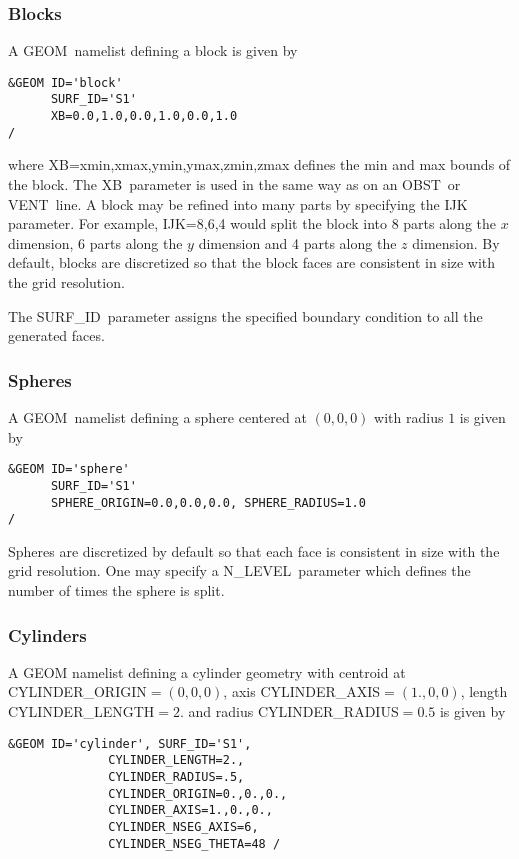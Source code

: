 \documentclass[12pt]{article}
\begin{document}
\subsubsection{Blocks}
A {\ct GEOM}\ namelist defining a block is given by

\begin{verbatim}
&GEOM ID='block'
      SURF_ID='S1'
      XB=0.0,1.0,0.0,1.0,0.0,1.0
/
\end{verbatim}

\noindent where {\ct XB=xmin,xmax,ymin,ymax,zmin,zmax} defines the min and max bounds of the block.
The {\ct XB}\ parameter is used in the same way as on an {\ct OBST}\ or {\ct VENT}\ line.
A block may be refined into many parts by specifying the {\ct IJK} parameter.
For example, {\ct IJK=8,6,4} would split the block into 8 parts along the $x$ dimension,
6 parts along the $y$ dimension and 4 parts along the $z$ dimension.
By default, blocks are discretized so that the block faces are consistent in size with the grid resolution.

The {\ct SURF\_ID}\ parameter assigns the specified boundary condition to all the generated faces.

\subsubsection{Spheres}
A {\ct GEOM}\ namelist defining a sphere centered at $(0,0,0)$ with radius $1$ is given by

\begin{verbatim}
&GEOM ID='sphere'
      SURF_ID='S1'
      SPHERE_ORIGIN=0.0,0.0,0.0, SPHERE_RADIUS=1.0
/
\end{verbatim}

\noindent Spheres are discretized by default so that each face is consistent in size with the grid resolution.
One may specify a {\ct N\_LEVEL}\ parameter which defines the number of times the sphere is split.


\subsubsection{Cylinders}


A {\ct GEOM} namelist defining a cylinder geometry with centroid at {\ct CYLINDER\_ORIGIN}$=(0,0,0)$, axis {\ct CYLINDER\_AXIS}$=(1.,0,0)$, length {\ct CYLINDER\_LENGTH}$=2.$ and radius {\ct CYLINDER\_RADIUS}$=0.5$ is given by

\begin{verbatim}
&GEOM ID='cylinder', SURF_ID='S1', 
              CYLINDER_LENGTH=2., 
              CYLINDER_RADIUS=.5, 
              CYLINDER_ORIGIN=0.,0.,0., 
              CYLINDER_AXIS=1.,0.,0., 
              CYLINDER_NSEG_AXIS=6, 
              CYLINDER_NSEG_THETA=48 /             
 \end{verbatim}
\end{document}
